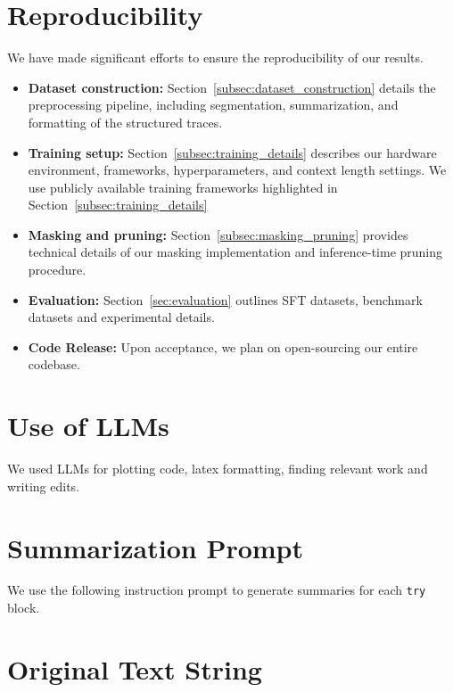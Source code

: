 \documentclass{article}
\begin{document}
\section{Reproducibility}
We have made significant efforts to ensure the reproducibility of our results. 
\begin{itemize}[leftmargin=*]
    \item \textbf{Dataset construction:} Section~\ref{subsec:dataset_construction} details the preprocessing pipeline, including segmentation, summarization, and formatting of the structured traces.  
    \item \textbf{Training setup:} Section~\ref{subsec:training_details} describes our hardware environment, frameworks, hyperparameters, and context length settings. We use publicly available training frameworks highlighted in Section~\ref{subsec:training_details}  
    \item \textbf{Masking and pruning:} Section~\ref{subsec:masking_pruning} provides technical details of our masking implementation and inference-time pruning procedure.  
    \item \textbf{Evaluation:} Section~\ref{sec:evaluation} outlines SFT datasets, benchmark datasets and experimental details.  
    \item \textbf{Code Release:} Upon acceptance, we plan on open-sourcing our entire codebase.
\end{itemize}






\appendix
\section{Use of LLMs}
We used LLMs for plotting code, latex formatting, finding relevant work and writing edits.



\section{Summarization Prompt}

We use the following instruction prompt to generate summaries for each \texttt{try} block.
\label{app:summ_prompt}
\\


\section*{Original Text String}
\end{document}
